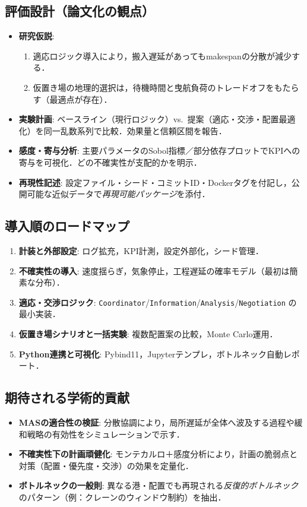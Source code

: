 \documentclass[10pt,letterpaper]{jsarticle}
\begin{document}
\subsection{評価設計（論文化の観点）}
\begin{itemize}
\item \textbf{研究仮説}:
\begin{enumerate}
\item 適応ロジック導入により，搬入遅延があってもmakespanの分散が減少する．
\item 仮置き場の地理的選択は，待機時間と曳航負荷のトレードオフをもたらす（最適点が存在）．
\end{enumerate}
\item \textbf{実験計画}: ベースライン（現行ロジック）vs.\ 提案（適応・交渉・配置最適化）を同一乱数系列で比較．効果量と信頼区間を報告．
\item \textbf{感度・寄与分析}: 主要パラメータのSobol指標／部分依存プロットでKPIへの寄与を可視化．どの不確実性が支配的かを明示．
\item \textbf{再現性記述}: 設定ファイル・シード・コミットID・Dockerタグを付記し，公開可能な近似データで\emph{再現可能パッケージ}を添付．
\end{itemize}

\subsection{導入順のロードマップ}
\begin{enumerate}
\item \textbf{計装と外部設定}: ログ拡充，KPI計測，設定外部化，シード管理．
\item \textbf{不確実性の導入}: 速度揺らぎ，気象停止，工程遅延の確率モデル（最初は簡素な分布）．
\item \textbf{適応・交渉ロジック}: \texttt{Coordinator}/\texttt{Information}/\texttt{Analysis}/\texttt{Negotiation} の最小実装．
\item \textbf{仮置き場シナリオと一括実験}: 複数配置案の比較，Monte Carlo運用．
\item \textbf{Python連携と可視化}: Pybind11，Jupyterテンプレ，ボトルネック自動レポート．
\end{enumerate}

\subsection{期待される学術的貢献}
\begin{itemize}
\item \textbf{MASの適合性の検証}: 分散協調により，局所遅延が全体へ波及する過程や緩和戦略の有効性をシミュレーションで示す．
\item \textbf{不確実性下の計画頑健化}: モンテカルロ＋感度分析により，計画の脆弱点と対策（配置・優先度・交渉）の効果を定量化．
\item \textbf{ボトルネックの一般則}: 異なる港・配置でも再現される\emph{反復的ボトルネック}のパターン（例：クレーンのウィンドウ制約）を抽出．
\end{itemize}
\end{document}
